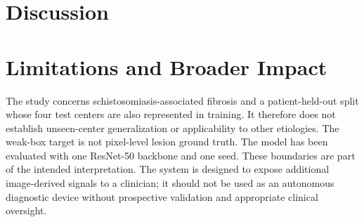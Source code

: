 \documentclass{article}
\begin{document}
\section{Discussion}
\label{sec:discussion}


\section{Limitations and Broader Impact}
The study concerns schistosomiasis-associated fibrosis and a patient-held-out split whose four test centers are also represented in training. It therefore does not establish unseen-center generalization or applicability to other etiologies. The weak-box target is not pixel-level lesion ground truth. The model has been evaluated with one ResNet-50 backbone and one seed. These boundaries are part of the intended interpretation. The system is designed to expose additional image-derived signals to a clinician; it should not be used as an autonomous diagnostic device without prospective validation and appropriate clinical oversight.



\end{document}
